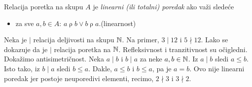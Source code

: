 \begin{DEF}
Relacija poretka na skupu $A$ je \emph{linearni (ili totalni) poredak} ako va\v zi slede\'ce
\begin{itemize}
  \item za sve $a, b \in A$: $a \mathrel\rho b \lor b \mathrel\rho a.$\hfill (linearnost)
\end{itemize}
\end{DEF}

\begin{EX}\label{ft07.ex.deljivost}
  Neka je $\mid$ relacija deljivosti na skupu $\mathbb{N}$. Na primer, $3 \mid 12$ i $5 \nmid 12$. Lako se dokazuje da je
  $\mid$ relacija poretka na $\mathbb{N}$. Refleksivnost i tranzitivnost su o\v cigledni. Doka\v zimo antisimetri\v cnost.
  Neka $a \mid b$ i $b \mid a$ za neke $a, b \in \mathbb{N}$. Iz $a \mid b$ sledi $a \le b$. Isto tako, iz $b \mid a$ sledi
  $b \le a$. Dakle, $a \le b$ i $b \le a$, pa je $a = b$. Ovo nije linearni poredak jer postoje neuporedivi elementi,
  recimo, $2 \nmid 3$ i $3 \nmid 2$.
\end{EX}



